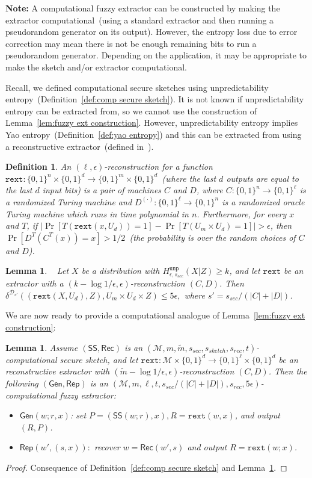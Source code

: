 \documentclass[11pt]{article}
\newcommand{\defref}[1]{\mbox{Definition~\ref{#1}}}
\newcommand{\lemref}[1]{\mbox{Lemma~\ref{#1}}}
\newcommand{\class}[1]{{\ensuremath{\mathsf{#1}}}}
\newcommand{\gen}{\ensuremath{\class{Gen}}\xspace}
\newcommand{\rep}{\ensuremath{\class{Rep}}\xspace}
\newcommand{\sketch}{\ensuremath{\class{SS}}\xspace}
\newcommand{\rec}{\ensuremath{\class{Rec}}\xspace}
\newcommand{\unp}{\ensuremath{\mathtt{unp}}\xspace}
\newcommand{\rext}{\ensuremath{\mathtt{rext}}}
\newtheorem{lemma}[theorem]{Lemma}
\newtheorem{definition}[theorem]{Definition}
\begin{document}
\textbf{Note: }A computational fuzzy extractor can be constructed by making the extractor computational~(using a standard extractor and then running a pseudorandom generator on its output).  However, the entropy loss due to error correction may mean there is not be enough remaining bits to run a pseudorandom generator.  Depending on the application, it may be appropriate to make the sketch and/or extractor computational.

Recall, we defined computational secure sketches using unpredictability entropy~(\defref{def:comp secure sketch}).  It is not known if unpredictability entropy can be extracted from, so we cannot use the construction of \lemref{lem:fuzzy ext construction}.  However, unpredictability entropy implies Yao entropy~(\defref{def:yao entropy}) and this can be extracted from using a reconstructive extractor~(defined in~\cite{barak-computational}).  
\begin{definition}
An $(\ell, \epsilon)$-reconstruction for a function $\rext:\{0,1\}^n\times \{0,1\}^d\rightarrow \{0,1\}^m\times\{0,1\}^d$~(where the last $d$ outputs are equal to the last $d$ input bits) is a pair of machines $C$ and $D$, where $C:\{0,1\}^n\rightarrow \{0,1\}^\ell$ is a randomized Turing machine and $D^{(\cdot)}:\{0,1\}^\ell\rightarrow \{0,1\}^n$ is a randomized oracle Turing machine which runs in time polynomial in $n$.  Furthermore, for every $x$ and $T$, if $|\Pr[T(\rext(x, U_d)) =1] -\Pr[T(U_m\times U_d)=1]|>\epsilon$, then $\Pr[D^T(C^T(x))=x]>1/2$~(the probability is over the random choices of $C$ and $D$).
\end{definition}
\begin{lemma}~\cite[Lemma 6]{DBLP:conf/eurocrypt/HsiaoLR07}
\label{lem:unp extraction} 
Let $X$ be a distribution with $H^{\unp}_{\epsilon, s_{sec}}(X|Z)\geq k$, and let $\rext$ be an extractor with a $(k-\log 1/\epsilon, \epsilon)$-reconstruction $(C,D)$.  Then $\delta^{\mathcal{D}_{s'}}((\rext(X, U_d), Z), U_m\times U_d\times Z)\leq 5\epsilon,$ where $s'=s_{sec}/(|C|+|D|)$.
\end{lemma}
We are now ready to provide a computational analogue of \lemref{lem:fuzzy ext construction}:
\begin{lemma}
Assume $(\sketch, \rec)$ is an $(\mathcal{M}, m, \tilde{m}, s_{sec}, s_{sketch}, s_{rec}, t)$-computational secure sketch, and let $\rext:\mathcal{M}\times \{0,1\}^d\rightarrow \{0,1\}^\ell \times \{0, 1\}^d$ be an reconstructive extractor with $(\tilde{m}-\log 1/\epsilon, \epsilon)$-reconstruction $(C, D)$.  Then the following $(\gen, \rep)$ is an $(\mathcal{M}, m, \ell, t, s_{sec}/(|C|+|D|), s_{rec}, 5\epsilon)$-computational fuzzy extractor:
\begin{itemize}
\item $\gen(w;r, x)$: set $P= (\sketch(w; r), x), R = \rext(w, x)$, and output $(R,P)$.
\item $\rep(w', (s, x)):$ recover $w = \rec(w', s)$ and output $R = \rext(w;x)$.
\end{itemize}
\end{lemma}
\begin{proof}
Consequence of \defref{def:comp secure sketch} and \lemref{lem:unp extraction}.
\end{proof}
\end{document}
